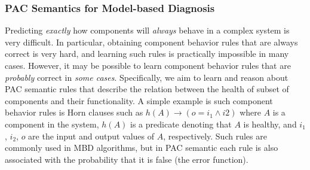 \documentclass[12pt]{article}
\newcommand{\note}[1]{\textbf{\textit{#1}}}
\begin{document}




\subsubsection{PAC Semantics for Model-based Diagnosis}


Predicting {\em exactly} how components will {\em always} behave in a complex system is very difficult. In particular, obtaining component behavior rules that are always correct is very hard, and learning such rules is practically impossible in many cases. However, it may be possible to learn component behavior rules that are {\em probably} correct in {\em some cases}. Specifically, we aim to learn and reason about PAC semantic rules that describe the relation between 
the health of subset of components and their functionality. 
A simple example is such component behavior rules is Horn clauses such as $h(A)\rightarrow (o = i_1 \wedge i2)$
where $A$ is a component in the system, $h(A)$ is a predicate denoting that $A$ is healthy, and $i_1$, $i_2$, $o$ are the input and output values of $A$, respectively. Such rules are commonly used in MBD algorithms,
but in PAC semantic each rule is also associated with the probability that it is false (the error function). 
\end{document}
